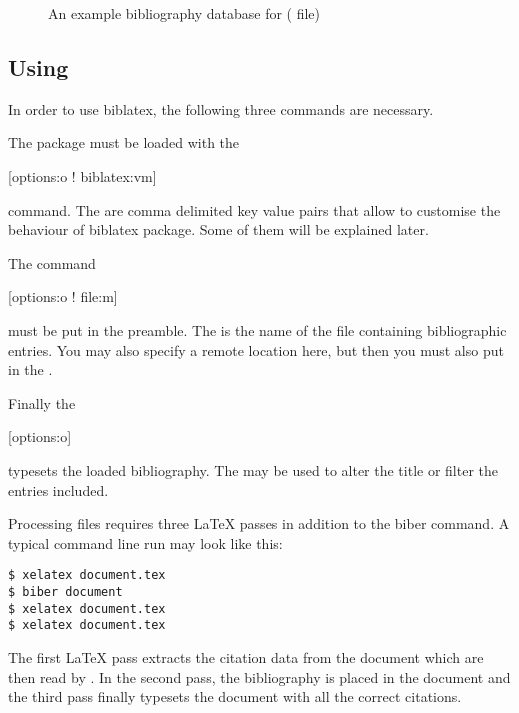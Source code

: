 \begin{figure}[htp]
  \begin{lined}{\textwidth}
    
  \end{lined}
  \caption[An example of bibliography database]{An example bibliography
  database for  ( file)} \label{fig:bibfile}
\end{figure}

\subsection{Using }

In order to use biblatex, the following three commands are necessary.

The  package must be loaded with the
\begin{lscommand}
  [options:o ! biblatex:vm]
\end{lscommand}
command. The  are comma delimited key value pairs that allow to
customise the behaviour of biblatex package. Some of them will be explained
later.

The command
\begin{lscommand}
  [options:o ! file:m]
\end{lscommand}
must be put in the preamble. The  is the name of the  file
containing bibliographic entries. You may also specify a remote location here,
but then you must also put  in the .

Finally the
\begin{lscommand}
  [options:o]
\end{lscommand}
typesets the loaded bibliography. The  may be used to alter the
title or filter the entries included.

Processing files requires three \LaTeX{} passes in addition to the biber
command. A typical command line run may look like this:
\begin{code}
\begin{verbatim}
$ xelatex document.tex
$ biber document
$ xelatex document.tex
$ xelatex document.tex
\end{verbatim}
\end{code}
The first \LaTeX{} pass extracts the citation data from the document which are
then read by . In the second pass, the bibliography is placed in the
document and the third pass finally typesets the document with all the correct citations.

